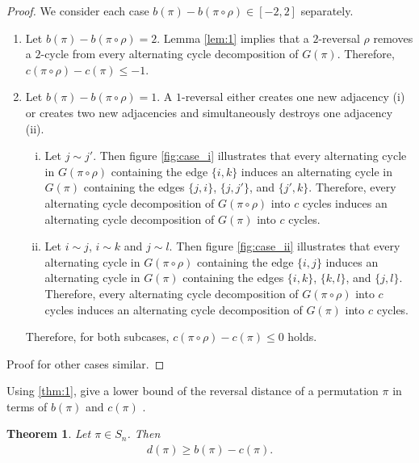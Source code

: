 \documentclass[11pt,DIV=11]{scrartcl}
\newtheorem{theorem}{Theorem}[section]
\theoremstyle{definition}
\theoremstyle{remark}
\begin{document}
\begin{proof}
We consider each case $b(\pi) - b(\pi \circ \rho) \in [-2,2]$ separately.
\begin{enumerate}
    \item Let $b(\pi) - b(\pi \circ \rho) = 2$. Lemma \ref{lem:1} implies that a $2$-reversal $\rho$ removes a $2$-cycle from every alternating cycle decomposition of $G(\pi)$. Therefore, $c(\pi \circ \rho) - c(\pi) \leq -1$.
    \item Let $b(\pi) - b(\pi \circ \rho) = 1$. A $1$-reversal either creates one new adjacency (i) or creates two new adjacencies and simultaneously destroys one adjacency (ii).
        \begin{enumerate}[(i)]
            \item Let $j \sim j'$. Then figure \ref{fig:case_i} illustrates that every alternating cycle in $G(\pi \circ \rho)$ containing the edge $\{i,k\}$ induces an alternating cycle in $G(\pi)$ containing the edges $\{j,i\}$, $\{j,j'\}$, and $\{j',k\}$. Therefore, every alternating cycle decomposition of $G(\pi \circ \rho)$ into $c$ cycles induces an alternating cycle decomposition of $G(\pi)$ into $c$ cycles.
            \item Let $i \sim j$, $i \sim k$ and $j \sim l$. Then figure \ref{fig:case_ii} illustrates that every alternating cycle in $G(\pi \circ \rho)$ containing the edge $\{i,j\}$ induces an alternating cycle in $G(\pi)$ containing the edges $\{i,k\}$, $\{k,l\}$, and $\{j,l\}$. Therefore, every alternating cycle decomposition of $G(\pi \circ \rho)$ into $c$ cycles induces an alternating cycle decomposition of $G(\pi)$ into $c$ cycles.
        \end{enumerate}
    Therefore, for both subcases, $c(\pi \circ \rho) - c(\pi) \leq 0$ holds.
\end{enumerate}
Proof for other cases similar.
\end{proof}

Using \ref{thm:1}, \citeauthor*{Bafna1996} give a lower bound of the reversal distance of a permutation $\pi$ in terms of $b(\pi)$ and $c(\pi)$ \cite{Bafna1996}.

\begin{theorem}
\label{thm:2}
Let $\pi \in S_n$. Then
\begin{align*}
    d(\pi) \geq b(\pi) - c(\pi).
\end{align*}
\end{theorem}
\end{document}

